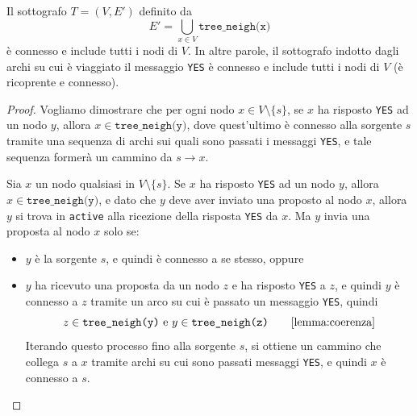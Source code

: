 \begin{lemma}\label{lemma:spanning}
    Il sottografo $T = (V, E')$ definito da 
    \[
        E' = \bigcup_{x \in V} \texttt{tree\_neigh(x)}
    \]
    è connesso e include tutti i nodi di $V$. In altre parole, il sottografo indotto dagli archi su cui è viaggiato il messaggio \texttt{YES} è connesso e include tutti i nodi di $V$ (è ricoprente e connesso).
    \begin{proof}
        Vogliamo dimostrare che per ogni nodo $x \in V \setminus \{s\}$, se $x$ ha risposto \texttt{YES} ad un nodo $y$, allora $x \in \texttt{tree\_neigh(y)}$, dove quest'ultimo è connesso alla sorgente $s$ tramite una sequenza di archi sui quali sono passati i messaggi \texttt{YES}, e tale sequenza formerà un cammino da $s \to x$.
        
        Sia $x$ un nodo qualsiasi in $V \setminus \{s\}$. Se $x$ ha risposto \texttt{YES} ad un nodo $y$, allora $x \in \texttt{tree\_neigh(y)}$, e dato che $y$ deve aver inviato una proposto al nodo $x$, allora $y$ si trova in \texttt{active} alla ricezione della risposta \texttt{YES} da $x$. Ma $y$ invia una proposta al nodo $x$ solo se:
        \begin{itemize}
            \item $y$ è la sorgente $s$, e quindi è connesso a se stesso, oppure
            \item $y$ ha ricevuto una proposta da un nodo $z$ e ha risposto \texttt{YES} a $z$, e quindi $y$ è connesso a $z$ tramite un arco su cui è passato un messaggio \texttt{YES}, quindi 
            \[
            z \in \texttt{tree\_neigh(y)} \text{ e } y \in \texttt{tree\_neigh(z)} \qquad \autoref{lemma:coerenza}
            \]
            Iterando questo processo fino alla sorgente $s$, si ottiene un cammino che collega $s$ a $x$ tramite archi su cui sono passati messaggi \texttt{YES}, e quindi $x$ è connesso a $s$.
        \end{itemize}
    \end{proof}
\end{lemma}

